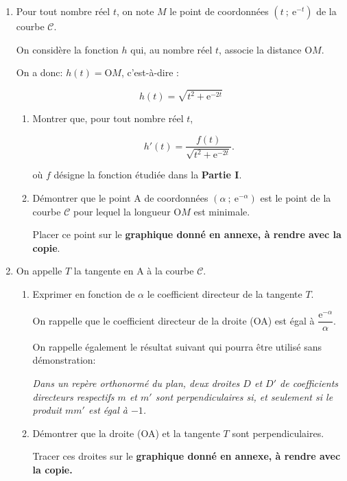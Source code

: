 \begin{enumerate}
\item Pour tout nombre réel $t$, on note $M$ le point de coordonnées $\left(t~;~\text{e}^{-t}\right)$ de la courbe $\mathcal{C}$.

On considère la fonction $h$ qui, au nombre réel $t$, associe la distance O$M$.

On a donc: $h(t) = \text{O}M$, c'est-à-dire :

\[h(t) = \sqrt{t^2 + \text{e}^{-2t}}\]

	\begin{enumerate}
		\item Montrer que, pour tout nombre réel $t$,

\[h'(t) = \dfrac{f(t)}{\sqrt{t^2 + \text{e}^{-2t}}}.\]

où $f$ désigne la fonction étudiée dans la \textbf{Partie I}.
		\item Démontrer que le point A de coordonnées $\left(\alpha~;~\text{e}^{-\alpha}\right)$ est le point de la courbe $\mathcal{C}$ pour lequel la longueur O$M$ est minimale.
		

Placer ce point sur le \textbf{graphique donné en annexe, à rendre avec la copie}.
	\end{enumerate}
\item On appelle $T$ la tangente en A à la courbe $\mathcal{C}$.
	\begin{enumerate}
		\item Exprimer en fonction de $\alpha$ le coefficient directeur de la tangente $T$.
		
On rappelle que le coefficient directeur de la droite (OA) est égal à $\dfrac{\text{e}^{-\alpha}}{\alpha}$.

On rappelle également le résultat suivant qui pourra être utilisé sans démonstration:

\emph{Dans un repère orthonormé du plan, deux droites $D$ et $D'$ de coefficients directeurs respectifs $m$ et $m'$ sont perpendiculaires si, et seulement si le produit $mm'$ est égal à $-1$.}

		\item Démontrer que la droite (OA) et la tangente $T$ sont perpendiculaires. 
		
Tracer ces droites sur le \textbf{graphique donné en annexe, à rendre avec la copie.}
	\end{enumerate}
\end{enumerate}

